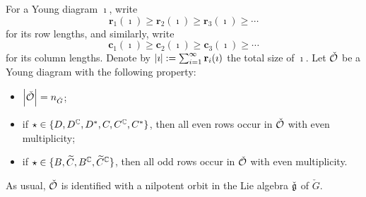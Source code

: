 \documentclass[counting_main.tex]{subfiles}
\begin{document}
For a Young diagram $\imath$, write
\[
 \mathbf r_1(\imath)\geq \mathbf r_2(\imath)\geq \mathbf r_3(\imath)\geq \cdots
\]
for its row lengths, and similarly,
write
\[
 \mathbf c_1(\imath)\geq \mathbf c_2(\imath)\geq \mathbf c_3(\imath)\geq \cdots
\]
for its column lengths.
Denote by $\left|{\imath}\right|:=\sum_{i=1}^\infty \mathbf r_i(\imath)$ the total size of $\imath$.
Let $\check {{\mathcal {O}}}$ be a Young diagram with  the following property:
\begin{itemize}
\item $\left|{\check {{\mathcal {O}}}}\right|=n_{\check G}$;
\item if $\star\in\{D,  D^{\mathbb{C}},  D^*,C, C^{\mathbb{C}}, C^* \} $, then all even rows occur in $\check {{\mathcal {O}}}$ with even multiplicity;
\item if $\star\in \{B, \widetilde C, B^{\mathbb{C}}, \widetilde C^{\mathbb{C}} \}$, then all odd rows occur in $\check {{\mathcal {O}}}$ with even multiplicity.
\end{itemize}
As usual, $\check {{\mathcal {O}}}$ is identified with a nilpotent orbit in the Lie algebra $\check {\mathfrak g}$ of $\check G$.
\end{document}
